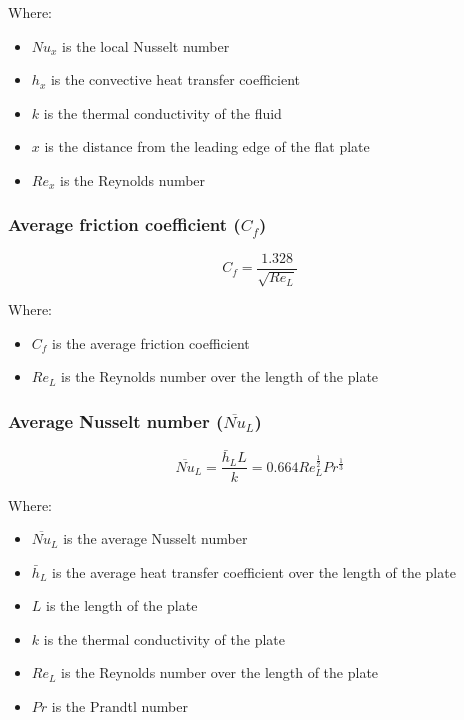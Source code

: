 \documentclass[11pt]{article}
\begin{document}
Where:
\begin{itemize}
\item \(Nu_x\) is the local Nusselt number
\item \(h_x\) is the convective heat transfer coefficient
\item \(k\) is the thermal conductivity of the fluid
\item \(x\) is the distance from the leading edge of the flat plate
\item \(Re_x\) is the Reynolds number
\end{itemize}
\subsubsection{Average friction coefficient (\(C_f\))}
\label{sec:org629b6e8}
\[C_f = \frac{1.328}{\sqrt{Re_L}}\]

Where:
\begin{itemize}
\item \(C_f\) is the average friction coefficient
\item \(Re_L\) is the Reynolds number over the length of the plate
\end{itemize}
\subsubsection{Average Nusselt number (\(\overline{Nu}_L\))}
\label{sec:orgc9290da}
\[\overline{Nu}_L = \frac{\bar{h}_L L}{k} = 0.664 Re_L^{\frac{1}{2}} Pr^{\frac{1}{3}}\]

Where:
\begin{itemize}
\item \(\overline{Nu}_L\) is the average Nusselt number
\item \(\bar{h}_L\) is the average heat transfer coefficient over the length of the plate
\item \(L\) is the length of the plate
\item \(k\) is the thermal conductivity of the plate
\item \(Re_L\) is the Reynolds number over the length of the plate
\item \(Pr\) is the Prandtl number
\end{itemize}
\end{document}
